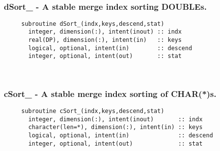  
\mbox{}\hrulefill\ 
 
  \subsubsection{dSort\_ - A stable merge index sorting DOUBLEs.}

\begin{verbatim} 
     subroutine dSort_(indx,keys,descend,stat)
       integer, dimension(:), intent(inout) :: indx
       real(DP), dimension(:), intent(in)   :: keys
       logical, optional, intent(in)        :: descend
       integer, optional, intent(out)       :: stat
 \end{verbatim}%
 
 
\mbox{}\hrulefill\ 
 

  \subsubsection{cSort\_ - A stable merge index sorting of CHAR(*)s.}

\begin{verbatim} 
     subroutine cSort_(indx,keys,descend,stat)
       integer, dimension(:), intent(inout)       :: indx
       character(len=*), dimension(:), intent(in) :: keys
       logical, optional, intent(in)              :: descend
       integer, optional, intent(out)             :: stat
 \end{verbatim}%
 
